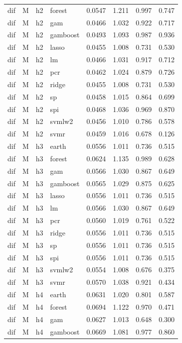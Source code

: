 \begin{ThreePartTable}
\begin{longtable}[t]{llclcccc}
dif & M & h2 & forest & 0.0547 & 1.211 & 0.997 & 0.747\\
dif & M & h2 & gam & 0.0466 & 1.032 & 0.922 & 0.717\\
dif & M & h2 & gamboost & 0.0493 & 1.093 & 0.987 & 0.936\\
dif & M & h2 & lasso & 0.0455 & 1.008 & 0.731 & 0.530\\
dif & M & h2 & lm & 0.0466 & 1.031 & 0.917 & 0.712\\
dif & M & h2 & pcr & 0.0462 & 1.024 & 0.879 & 0.726\\
dif & M & h2 & ridge & 0.0455 & 1.008 & 0.731 & 0.530\\
dif & M & h2 & sp & 0.0458 & 1.015 & 0.864 & 0.699\\
dif & M & h2 & spi & 0.0468 & 1.036 & 0.969 & 0.870\\
dif & M & h2 & svmlw2 & 0.0456 & 1.010 & 0.786 & 0.578\\
dif & M & h2 & svmr & 0.0459 & 1.016 & 0.678 & 0.126\\
\addlinespace
dif & M & h3 & earth & 0.0556 & 1.011 & 0.736 & 0.515\\
dif & M & h3 & forest & 0.0624 & 1.135 & 0.989 & 0.628\\
dif & M & h3 & gam & 0.0566 & 1.030 & 0.867 & 0.649\\
dif & M & h3 & gamboost & 0.0565 & 1.029 & 0.875 & 0.625\\
dif & M & h3 & lasso & 0.0556 & 1.011 & 0.736 & 0.515\\
dif & M & h3 & lm & 0.0566 & 1.030 & 0.867 & 0.649\\
dif & M & h3 & pcr & 0.0560 & 1.019 & 0.761 & 0.522\\
dif & M & h3 & ridge & 0.0556 & 1.011 & 0.736 & 0.515\\
dif & M & h3 & sp & 0.0556 & 1.011 & 0.736 & 0.515\\
dif & M & h3 & spi & 0.0556 & 1.011 & 0.736 & 0.515\\
dif & M & h3 & svmlw2 & 0.0554 & 1.008 & 0.676 & 0.375\\
dif & M & h3 & svmr & 0.0570 & 1.038 & 0.921 & 0.434\\
\addlinespace
dif & M & h4 & earth & 0.0631 & 1.020 & 0.801 & 0.587\\
dif & M & h4 & forest & 0.0694 & 1.122 & 0.970 & 0.471\\
dif & M & h4 & gam & 0.0627 & 1.013 & 0.648 & 0.300\\
dif & M & h4 & gamboost & 0.0669 & 1.081 & 0.977 & 0.860\\

\end{longtable}
\end{ThreePartTable}
